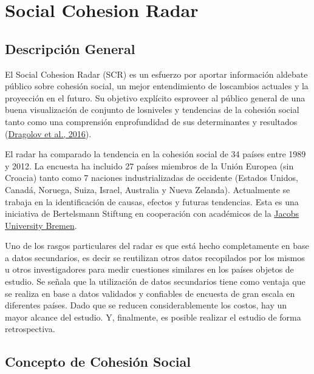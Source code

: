 \documentclass[
  12pt,
]{book}
\begin{document}
\hypertarget{social-cohesion-radar}{%
\chapter{Social Cohesion Radar}\label{social-cohesion-radar}}

\hypertarget{descripciuxf3n-general-2}{%
\section{Descripción General}\label{descripciuxf3n-general-2}}

El Social Cohesion Radar (SCR) es un esfuerzo por aportar información aldebate público sobre cohesión social, un mejor entendimiento de loscambios actuales y la proyección en el futuro. Su objetivo explícito esproveer al público general de una buena visualización de conjunto de losniveles y tendencias de la cohesión social tanto como una comprensión enprofundidad de sus determinantes y resultados (\protect\hyperlink{ref-dragolov_Social_2016}{Dragolov et al., 2016}).

El radar ha comparado la tendencia en la cohesión social de 34 países entre 1989 y 2012. La encuesta ha incluido 27 países miembros de la Unión Europea (sin Croacia) tanto como 7 naciones industrializadas de occidente (Estados Unidos, Canadá, Noruega, Suiza, Israel, Australia y Nueva Zelanda). Actualmente se trabaja en la identificación de causas, efectos y futuras tendencias. Esta es una iniciativa de Bertelsmann Stiftung en cooperación con académicos de la \href{https://www.bertelsmann-stiftung.de/en/our-projects/social-cohesion}{Jacobs University Bremen}.

Uno de los rasgos particulares del radar es que está hecho completamente en base a datos secundarios, es decir se reutilizan otros datos recopilados por los mismos u otros investigadores para medir cuestiones similares en los países objetos de estudio. Se señala que la utilización de datos secundarios tiene como ventaja que se realiza en base a datos validados y confiables de encuesta de gran escala en diferentes países. Dado que se reducen considerablemente los costos, hay un mayor alcance del estudio. Y, finalmente, es posible realizar el estudio de forma retrospectiva.

\hypertarget{concepto-de-cohesiuxf3n-social-2}{%
\section{Concepto de Cohesión Social}\label{concepto-de-cohesiuxf3n-social-2}}
\end{document}
